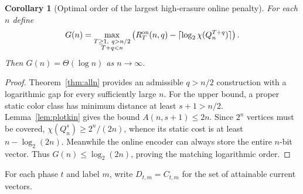 \documentclass[11pt,a4paper]{article}
\newtheorem{corollary}[theorem]{Corollary}
\begin{document}
\begin{corollary}[Optimal order of the largest high-erasure online penalty]\label{cor:sharp}
For each $n$ define
\[
 G(n)=\max_{\substack{T\ge1,\ q>n/2\\T+q<n}}
 \left(R_T^{\rm on}(n,q)-\lceil\log_2\chi(Q_n^{T+q})\rceil\right).
\]
Then $G(n)=\Theta(\log n)$ as $n\to\infty$.
\end{corollary}
\begin{proof}
Theorem~\ref{thm:alln} provides an admissible $q>n/2$ construction with a logarithmic gap for every sufficiently large $n$. For the upper bound, a proper static color class has minimum distance at least $s+1>n/2$. Lemma~\ref{lem:plotkin} gives the bound $A(n,s+1)\le2n$. Since $2^n$ vertices must be covered, $\chi(Q_n^s)\ge2^n/(2n)$, whence its static cost is at least $n-\log_2(2n)$. Meanwhile the online encoder can always store the entire $n$-bit vector. Thus $G(n)\le\log_2(2n)$, proving the matching logarithmic order.
\end{proof}

\noindent For each phase $t$ and label $m$, write $D_{t,m}=C_{t,m}$ for the set of attainable current vectors.\par
\end{document}
